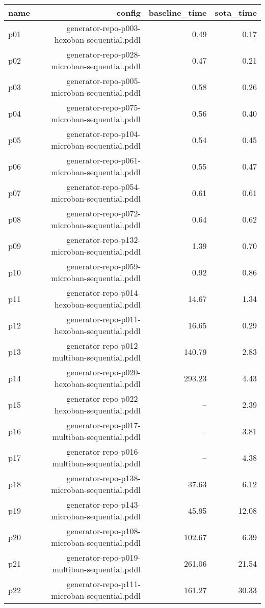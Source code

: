 \documentclass{article}
\begin{document}
                            \begin{center}
                            \scriptsize
                            \begin{tabular}{@{}l|r|r|r@{}}
                            name & config & baseline\_time & sota\_time\\\midrule
                              p01& generator-repo-p003-hexoban-sequential.pddl&0.49&0.17\\
  p02& generator-repo-p028-microban-sequential.pddl&0.47&0.21\\
  p03& generator-repo-p005-microban-sequential.pddl&0.58&0.26\\
  p04& generator-repo-p075-microban-sequential.pddl&0.56&0.40\\
  p05& generator-repo-p104-microban-sequential.pddl&0.54&0.45\\
  p06& generator-repo-p061-microban-sequential.pddl&0.55&0.47\\
  p07& generator-repo-p054-microban-sequential.pddl&0.61&0.61\\
  p08& generator-repo-p072-microban-sequential.pddl&0.64&0.62\\
  p09& generator-repo-p132-microban-sequential.pddl&1.39&0.70\\
  p10& generator-repo-p059-microban-sequential.pddl&0.92&0.86\\
  p11& generator-repo-p014-hexoban-sequential.pddl&14.67&1.34\\
  p12& generator-repo-p011-hexoban-sequential.pddl&16.65&0.29\\
  p13& generator-repo-p012-multiban-sequential.pddl&140.79&2.83\\
  p14& generator-repo-p020-hexoban-sequential.pddl&293.23&4.43\\
  p15& generator-repo-p022-hexoban-sequential.pddl&--&2.39\\
  p16& generator-repo-p017-multiban-sequential.pddl&--&3.81\\
  p17& generator-repo-p016-multiban-sequential.pddl&--&4.38\\
  p18& generator-repo-p138-microban-sequential.pddl&37.63&6.12\\
  p19& generator-repo-p143-microban-sequential.pddl&45.95&12.08\\
  p20& generator-repo-p108-microban-sequential.pddl&102.67&6.39\\
  p21& generator-repo-p019-multiban-sequential.pddl&261.06&21.54\\
  p22& generator-repo-p111-microban-sequential.pddl&161.27&30.33\\

\end{tabular}
\end{center}
\end{document}
